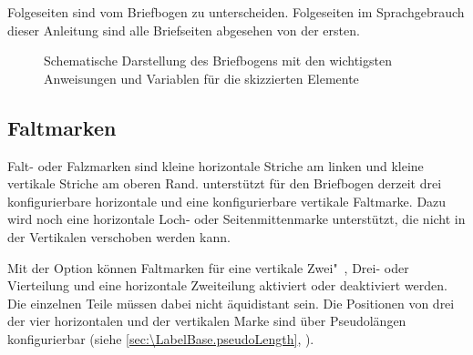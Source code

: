 Folgeseiten sind vom Briefbogen zu
unterscheiden. Folgeseiten im Sprachgebrauch dieser Anleitung sind alle
Briefseiten abgesehen von der ersten.


\begin{figure}
  \centering
  \tikzset{x=.56mm,y=-.56mm}
  \tiny
  
  \caption{Schematische Darstellung des Briefbogens mit den wichtigsten
    Anweisungen und Variablen für die skizzierten Elemente}
  \label{fig:\LabelBase.variables}
\end{figure}


\subsection{Faltmarken}
\BeginIndexGroup
{}%

Falt- oder Falzmarken sind kleine horizontale Striche am linken und kleine
vertikale Striche am oberen Rand. \KOMAScript{} unterstützt für den Briefbogen
derzeit drei konfigurierbare horizontale und eine konfigurierbare vertikale
Faltmarke. Dazu wird noch eine horizontale Loch- oder Seitenmittenmarke
unterstützt, die nicht in der Vertikalen verschoben werden kann.

\begin{Declaration}
\end{Declaration}
Mit der Option  können Faltmarken für eine
vertikale Zwei"~, Drei- oder Vierteilung und eine horizontale Zweiteilung
aktiviert oder deaktiviert werden. Die einzelnen Teile müssen dabei nicht
äquidistant sein. Die Positionen von drei der vier horizontalen und der
vertikalen Marke sind über Pseudolängen konfigurierbar (siehe
\autoref{sec:\LabelBase.pseudoLength},
).

